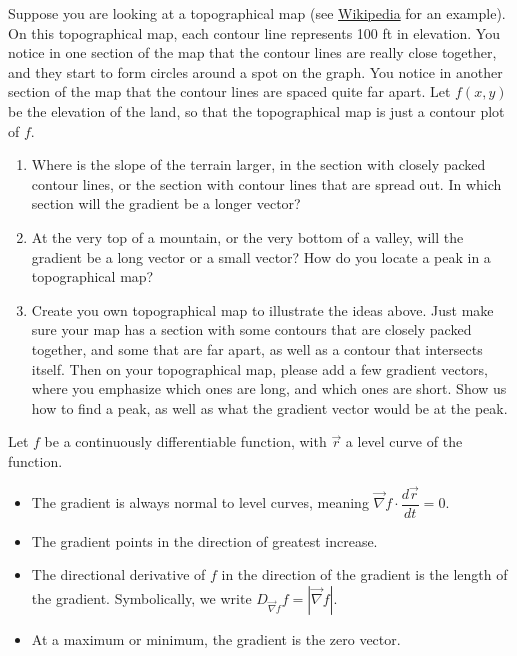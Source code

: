 \begin{challenge}
 Suppose you are looking at a topographical map (see \href{http://en.wikipedia.org/wiki/Topographic_map}{Wikipedia} for an example).  On this topographical map, each contour line represents 100 ft in elevation. You notice in one section of the map that the contour lines are really close together, and they start to form circles around a spot on the graph. You notice in another section of the map that the contour lines are spaced quite far apart. Let $f(x,y)$ be the elevation of the land, so that the topographical map is just a contour plot of $f$.  
\begin{enumerate}
 \item{}%
 Where is the slope of the terrain larger, in the section with closely packed contour lines, or the section with contour lines that are spread out. In which section will the gradient be a longer vector?
 \item At the very top of a mountain, or the very bottom of a valley, will the gradient be a long vector or a small vector? How do you locate a peak in a topographical map?
 \item {}%
Create you own topographical map to illustrate the ideas above. Just make sure your map has a section with some contours that are closely packed together, and some that are far apart, as well as a contour that intersects itself. Then on your topographical map, please add a few gradient vectors, where you emphasize which ones are long, and which ones are short. Show us how to find a peak, as well as what the gradient vector would be at the peak.  
\end{enumerate}
\end{challenge}

\begin{theorem}
 Let $f$ be a continuously differentiable function, with $\vec r$ a level curve of the function.
\begin{itemize}
 \item The gradient is always normal to level curves, meaning $\vec \nabla f\cdot \dfrac{d\vec r}{dt}=0$.
 \item The gradient points in the direction of greatest increase.
 \item The directional derivative of $f$ in the direction of the gradient is the length of the gradient. Symbolically, we write $D_{\vec \nabla f}f = |\vec \nabla f|$.
 \item At a maximum or minimum, the gradient is the zero vector. 
\end{itemize}
\end{theorem}


